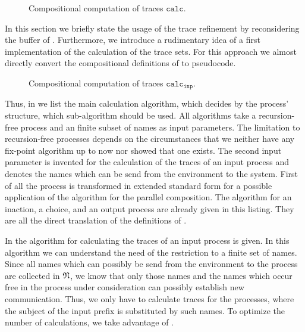 \begin{figure}[h!]

\caption{Compositional computation of traces $\mathtt{calc}$.}
\label{fig_comp_comput}
\end{figure}
In this section we briefly state the usage of the trace refinement by reconsidering the buffer of . Furthermore, we introduce a rudimentary idea of a first implementation of the calculation of the trace sets. For this approach we almost directly convert the compositional definitions of  to pseudocode.

\begin{figure}[H]

\caption{Compositional computation of traces $\mathtt{calc}_{\mathtt{inp}}$.}
\label{fig_comp_comput_inp}
\end{figure}

Thus, in  we list the main calculation algorithm, which decides by the process' structure, which sub-algorithm should be used. All algorithms take a recursion-free process and an finite subset of names as input parameters. The limitation to recursion-free processes depends on the circumstances that we neither have any fix-point algorithm up to now nor showed that one exists. The second input parameter is invented for the calculation of the traces of an input process and denotes the names which can be send from the environment to the system. First of all the process is transformed in extended standard form for a possible application of the algorithm for the parallel composition. The algorithm for an inaction, a choice, and an output process are already given in this listing. They are all the direct translation of the definitions of .

In  the algorithm for calculating the traces of an input process is given. In this algorithm we can understand the need of the restriction to a finite set of names. Since all names which can possibly be send from the environment to the process are collected in $\mathfrak{N}$, we know that only those names and the names which occur free in the process under consideration can possibly establish new communication. Thus, we only have to calculate traces for the processes, where the subject of the input prefix is substituted by such names. To optimize the number of calculations, we take advantage of .

